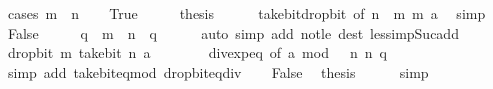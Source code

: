 \begin{isabellebody}
%
\isadelimproof
%
\endisadelimproof
%
\isatagproof
{}\isamarkupfalse%
\ {\isacharparenleft}{\kern0pt}cases\ {\isachardoublequoteopen}m\ {\isasymle}\ n{\isachardoublequoteclose}{\isacharparenright}{\kern0pt}\isanewline
\ \ \isamarkupfalse%
\ True\isanewline
\ \ \isamarkupfalse%
\ \isamarkupfalse%
\ {\isacharquery}{\kern0pt}thesis\isanewline
\ \ \ \ \isamarkupfalse%
\ take{\isacharunderscore}{\kern0pt}bit{\isacharunderscore}{\kern0pt}drop{\isacharunderscore}{\kern0pt}bit\ {\isacharbrackleft}{\kern0pt}of\ {\isachardoublequoteopen}n\ {\isacharminus}{\kern0pt}\ m{\isachardoublequoteclose}\ m\ a{\isacharbrackright}{\kern0pt}\ \isamarkupfalse%
\ simp\isanewline
{}\isamarkupfalse%
\isanewline
\ \ \isamarkupfalse%
\ False\isanewline
\ \ \isamarkupfalse%
\ \isamarkupfalse%
\ q\ \ {\isacartoucheopen}m\ {\isacharequal}{\kern0pt}\ n\ {\isacharplus}{\kern0pt}\ q{\isacartoucheclose}\isanewline
\ \ \ \ \isamarkupfalse%
\ {\isacharparenleft}{\kern0pt}auto\ simp\ add{\isacharcolon}{\kern0pt}\ not{\isacharunderscore}{\kern0pt}le\ dest{\isacharcolon}{\kern0pt}\ less{\isacharunderscore}{\kern0pt}imp{\isacharunderscore}{\kern0pt}Suc{\isacharunderscore}{\kern0pt}add{\isacharparenright}{\kern0pt}\isanewline
\ \ \isamarkupfalse%
\ \isamarkupfalse%
\ {\isacartoucheopen}drop{\isacharunderscore}{\kern0pt}bit\ m\ {\isacharparenleft}{\kern0pt}take{\isacharunderscore}{\kern0pt}bit\ n\ a{\isacharparenright}{\kern0pt}\ {\isacharequal}{\kern0pt}\ {}{\isacartoucheclose}\isanewline
\ \ \ \ \isamarkupfalse%
\ div{\isacharunderscore}{\kern0pt}exp{\isacharunderscore}{\kern0pt}eq\ {\isacharbrackleft}{\kern0pt}of\ {\isacartoucheopen}a\ mod\ {}\ {\isacharcircum}{\kern0pt}\ n{\isacartoucheclose}\ n\ q{\isacharbrackright}{\kern0pt}\isanewline
\ \ \ \ \isamarkupfalse%
\ {\isacharparenleft}{\kern0pt}simp\ add{\isacharcolon}{\kern0pt}\ take{\isacharunderscore}{\kern0pt}bit{\isacharunderscore}{\kern0pt}eq{\isacharunderscore}{\kern0pt}mod\ drop{\isacharunderscore}{\kern0pt}bit{\isacharunderscore}{\kern0pt}eq{\isacharunderscore}{\kern0pt}div{\isacharparenright}{\kern0pt}\isanewline
\ \ \isamarkupfalse%
\ False\ \isamarkupfalse%
\ {\isacharquery}{\kern0pt}thesis\isanewline
\ \ \ \ \isamarkupfalse%
\ simp\isanewline
{}\isamarkupfalse%
%
\endisatagproof
{\isafoldproof}%

\end{isabellebody}
